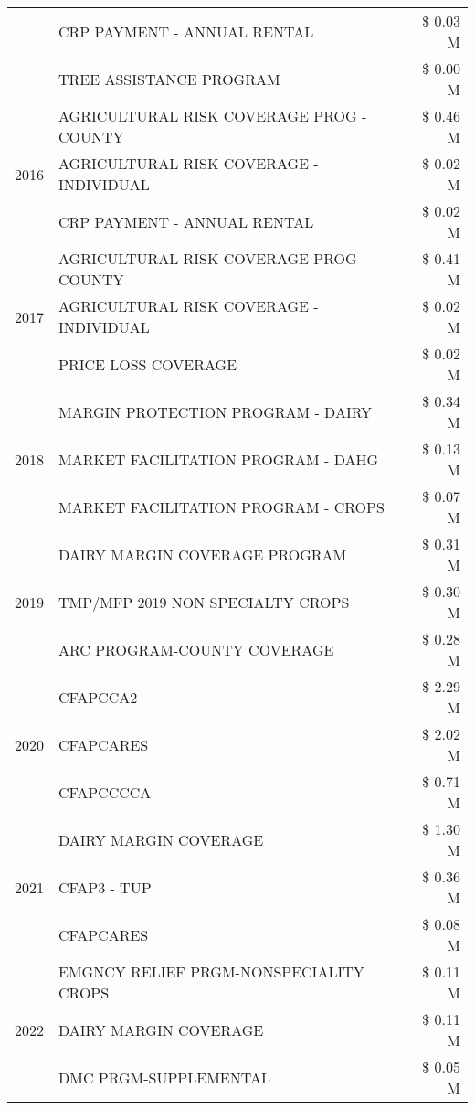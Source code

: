 \begin{tabular}{llr}
 & CRP PAYMENT - ANNUAL RENTAL & \$ 0.03 M \\
 & TREE ASSISTANCE PROGRAM & \$ 0.00 M \\
\cline{1-3}
\multirow[t]{3}{*}{2016} & AGRICULTURAL RISK COVERAGE PROG - COUNTY & \$ 0.46 M \\
 & AGRICULTURAL RISK COVERAGE - INDIVIDUAL & \$ 0.02 M \\
 & CRP PAYMENT - ANNUAL RENTAL & \$ 0.02 M \\
\cline{1-3}
\multirow[t]{3}{*}{2017} & AGRICULTURAL RISK COVERAGE PROG - COUNTY & \$ 0.41 M \\
 & AGRICULTURAL RISK COVERAGE - INDIVIDUAL & \$ 0.02 M \\
 & PRICE LOSS COVERAGE & \$ 0.02 M \\
\cline{1-3}
\multirow[t]{3}{*}{2018} & MARGIN PROTECTION PROGRAM - DAIRY & \$ 0.34 M \\
 & MARKET FACILITATION PROGRAM - DAHG & \$ 0.13 M \\
 & MARKET FACILITATION PROGRAM - CROPS & \$ 0.07 M \\
\cline{1-3}
\multirow[t]{3}{*}{2019} & DAIRY MARGIN COVERAGE PROGRAM & \$ 0.31 M \\
 & TMP/MFP 2019 NON SPECIALTY CROPS & \$ 0.30 M \\
 & ARC PROGRAM-COUNTY COVERAGE & \$ 0.28 M \\
\cline{1-3}
\multirow[t]{3}{*}{2020} & CFAPCCA2 & \$ 2.29 M \\
 & CFAPCARES & \$ 2.02 M \\
 & CFAPCCCCA & \$ 0.71 M \\
\cline{1-3}
\multirow[t]{3}{*}{2021} & DAIRY MARGIN COVERAGE & \$ 1.30 M \\
 & CFAP3 - TUP & \$ 0.36 M \\
 & CFAPCARES & \$ 0.08 M \\
\cline{1-3}
\multirow[t]{3}{*}{2022} & EMGNCY RELIEF PRGM-NONSPECIALITY CROPS & \$ 0.11 M \\
 & DAIRY MARGIN COVERAGE & \$ 0.11 M \\
 & DMC PRGM-SUPPLEMENTAL & \$ 0.05 M \\
\cline{1-3}
\bottomrule
\end{tabular}
